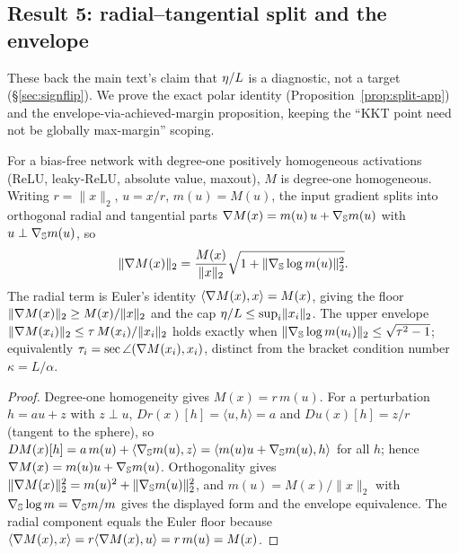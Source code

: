 \subsection{Result 5: radial--tangential split and the envelope}
\label{app:ft-split}
These back the main text's claim that $\eta/L$ is a diagnostic, not a target
(\S\ref{sec:signflip}). We prove the exact polar identity
(Proposition~\ref{prop:split-app}) and the envelope-via-achieved-margin
proposition, keeping the ``KKT point need not be globally max-margin'' scoping.

\begin{proposition}
\label{prop:split-app}
For a bias-free network with degree-one positively homogeneous activations
(ReLU, leaky-ReLU, absolute value, maxout), $M$ is degree-one homogeneous.
Writing $r=\lVert x\rVert_2$, $u=x/r$, $m(u)=M(u)$, the input gradient splits
into orthogonal radial and tangential parts
$\nabla M(x)=m(u)\,u+\nabla_{\mathbb S}m(u)$ with
$u\perp\nabla_{\mathbb S}m(u)$, so
\[
\lVert\nabla M(x)\rVert_2=\frac{M(x)}{\lVert x\rVert_2}\sqrt{1+\lVert\nabla_{\mathbb S}\log m(u)\rVert_2^2}.
\]
The radial term is Euler's identity $\langle\nabla M(x),x\rangle=M(x)$, giving the
floor $\lVert\nabla M(x)\rVert_2\ge M(x)/\lVert x\rVert_2$ and the cap
$\eta/L\le\sup_i\lVert x_i\rVert_2$. The upper envelope
$\lVert\nabla M(x_i)\rVert_2\le\tau\,M(x_i)/\lVert x_i\rVert_2$ holds exactly when
$\lVert\nabla_{\mathbb S}\log m(u_i)\rVert_2\le\sqrt{\tau^2-1}$; equivalently
$\tau_i=\sec\angle(\nabla M(x_i),x_i)$, distinct from the bracket condition number
$\kappa=L/\alpha$.
\end{proposition}
\begin{proof}
Degree-one homogeneity gives $M(x)=r\,m(u)$. For a perturbation $h=au+z$ with
$z\perp u$, $Dr(x)[h]=\langle u,h\rangle=a$ and $Du(x)[h]=z/r$ (tangent to the
sphere), so
$DM(x)[h]=a\,m(u)+\langle\nabla_{\mathbb S}m(u),z\rangle=\langle m(u)u+\nabla_{\mathbb S}m(u),h\rangle$
for all $h$; hence $\nabla M(x)=m(u)u+\nabla_{\mathbb S}m(u)$. Orthogonality gives
$\lVert\nabla M(x)\rVert_2^2=m(u)^2+\lVert\nabla_{\mathbb S}m(u)\rVert_2^2$, and
$m(u)=M(x)/\lVert x\rVert_2$ with
$\nabla_{\mathbb S}\log m=\nabla_{\mathbb S}m/m$ gives the displayed form and the
envelope equivalence. The radial component equals the Euler floor because
$\langle\nabla M(x),x\rangle=r\langle\nabla M(x),u\rangle=r\,m(u)=M(x)$.
\end{proof}

